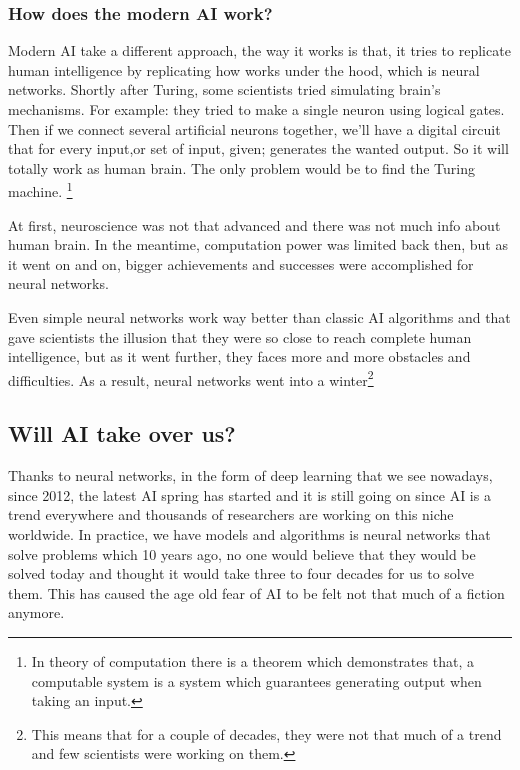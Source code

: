 \documentclass[twocolumn,a4paper, 10pt]{article}
\begin{document}
		\subsubsection{How does the modern AI work?}
			Modern AI take a different approach, the way it works is that, it tries to replicate 
			human intelligence by replicating how works under the hood, which is neural networks.
			Shortly after Turing, some scientists tried simulating brain's mechanisms. For example:
			they tried to make a single neuron using logical gates. Then if we connect several 
			artificial neurons together, we'll have a digital circuit that for every input,or set of input,
			given; generates the wanted output. So it will totally work as human brain. The only problem 
			would be to find the Turing machine. \footnote[2]{
				In theory of computation there is a theorem which demonstrates that, a computable system
				is a system which guarantees generating output when taking an input.
			}

			At first, neuroscience was not that advanced and there was not much info about human brain. 
			In the meantime, computation power was limited back then, but as it went on and on,
			bigger achievements and successes were accomplished for neural networks. 
			
			Even simple neural networks work way better than classic AI algorithms and that gave scientists
			the illusion that they were so close to reach complete human intelligence, but as it went further, 
			they faces more and more obstacles and difficulties. As a result, neural networks went into a winter\footnote[3]{
				This means that for a couple of decades, they were not that much of a trend and few scientists were 
				working on them.
			}


	\subsection{Will AI take over us?}
		Thanks to neural networks, in the form of deep learning that we see nowadays,
		since 2012, the latest AI spring has started and it is still going on since
		AI is a trend everywhere and thousands of researchers are working on this niche worldwide.
		In practice, we have models and algorithms is neural networks that solve problems which 10 years ago,
		no one would believe that they would be solved today and thought it would take three to four decades 
		for us to solve them. This has caused the age old fear of AI to be felt not that much of a fiction anymore.
\end{document}
